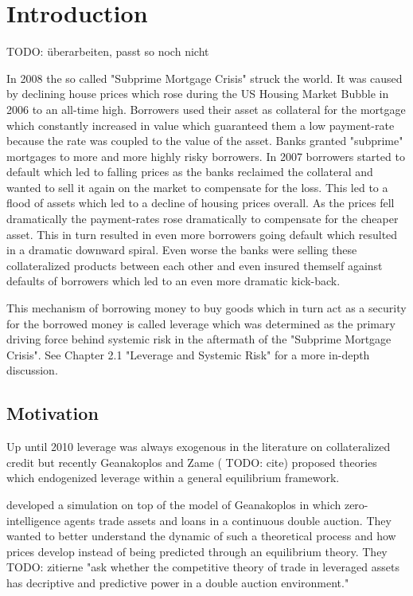 \documentclass[Bachelorarbeit.tex]{subfiles}
\begin{document}
\chapter{Introduction}

TODO: überarbeiten, passt so noch nicht

In 2008 the so called "Subprime Mortgage Crisis" struck the world. It was caused by declining house prices which rose during the US Housing Market Bubble in 2006 to an all-time high. Borrowers used their asset as collateral for the mortgage which constantly increased in value which guaranteed them a low payment-rate because the rate was coupled to the value of the asset.
Banks granted "subprime" mortgages to more and more highly risky borrowers. In 2007 borrowers started to default which led to falling prices as the banks reclaimed the collateral and wanted to sell it again on the market to compensate for the loss. This led to a flood of assets which led to a decline of housing prices overall.
As the prices fell dramatically the payment-rates rose dramatically to compensate for the cheaper asset. This in turn resulted in even more borrowers going default which resulted in a dramatic downward spiral.
Even worse the banks were selling these collateralized products between each other and even insured themself against defaults of borrowers which led to an even more dramatic kick-back.

\thinspace

This mechanism of borrowing money to buy goods which in turn act as a security for the borrowed money is called leverage which was determined as the primary driving force behind systemic risk in the aftermath of the "Subprime Mortgage Crisis". See Chapter 2.1 "Leverage and Systemic Risk" for a more in-depth discussion.

\section{Motivation}
Up until 2010 leverage was always exogenous in the literature on collateralized credit but recently Geanakoplos and Zame ( TODO: cite) proposed theories which endogenized leverage within a general equilibrium framework.

\thinspace

\cite{Breuer2015} developed a simulation on top of the model of Geanakoplos in which zero-intelligence agents trade assets and loans in a continuous double auction. They wanted to better understand the dynamic of such a theoretical process and how prices develop instead of being predicted through an equilibrium theory. They TODO: zitierne "ask whether the competitive theory of trade in leveraged assets has decriptive and predictive power in a double auction environment."
\end{document}
